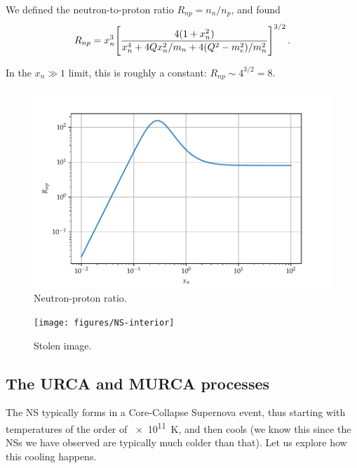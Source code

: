 \documentclass[main.tex]{subfiles}
\begin{document}

We defined the neutron-to-proton ratio \(R_{np} = n_n / n_p\), and found 
%
\begin{align}
R_{np} = x_n^3 \qty[\frac{4 (1 + x_n^2)}{x_n^4 + 4 Q x_n^2 / m_n + 4 (Q^2- m_e^2) / m_n^2}]^{3/2}
\,.
\end{align}

In the \(x_n \gg 1\) limit, this is roughly a constant: \(R_{np} \sim 4^{3/2} = 8\).

\begin{figure}[ht]
\centering
\includegraphics[width=\textwidth]{figures/neutron-proton-ratio}
\caption{Neutron-proton ratio.}
\label{fig:neutron-proton-ratio}
\end{figure}



\begin{figure}[]
\centering
\texttt{[image: figures/NS-interior]}
\caption{Stolen image.}
\label{fig:NS-interior}
\end{figure}

\subsection{The URCA and MURCA processes}

The NS typically forms in a Core-Collapse Supernova event, thus starting with temperatures of the order of \SI{e11}{K}, and then cools (we know this since the NSs we have observed are typically much colder than that). Let us explore how this cooling happens.
\end{document}

